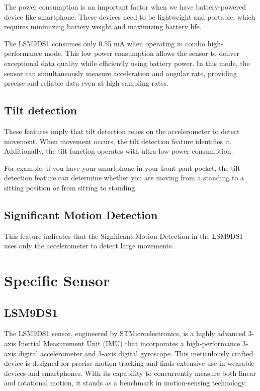 \bigskip

The power consumption is an important factor when we have battery-powered device like smartphone. These devices need to be lightweight and portable, which requires minimizing battery weight and maximizing battery life.

\bigskip

The LSM9DS1 consumes only 0.55 mA when operating in combo high-performance mode. This low power consumption allows the sensor to deliver exceptional data quality while efficiently using battery power. In this mode, the sensor can simultaneously measure acceleration and angular rate, providing precise and reliable data even at high sampling rates.


\subsection{Tilt detection}

These features imply that tilt detection relies on the accelerometer to detect movement. When movement occurs, the tilt detection feature identifies it. Additionally, the tilt function operates with ultra-low power consumption. \cite{st_microelectronics:2024}

For example, if you have your smartphone in your front pant pocket, the tilt detection feature can determine whether you are moving from a standing to a sitting position or from sitting to standing.

\subsection{Significant Motion Detection}

This feature indicates that the Significant Motion Detection in the LSM9DS1 uses only the accelerometer to detect large movements.\cite{st_microelectronics:2024}

\section{Specific Sensor }
\subsection{LSM9DS1}

The LSM9DS1 sensor, engineered by STMicroelectronics, is a highly advanced 3-axis Inertial Measurement Unit (IMU) that incorporates a high-performance 3-axis digital accelerometer and 3-axis digital gyroscope. This meticulously crafted device is designed for precise motion tracking and finds extensive use in wearable devices and smartphones. With its capability to concurrently measure both linear and rotational motion, it stands as a benchmark in motion-sensing technology. \cite{STMicroelectronics_LSM9DS1:2024}

